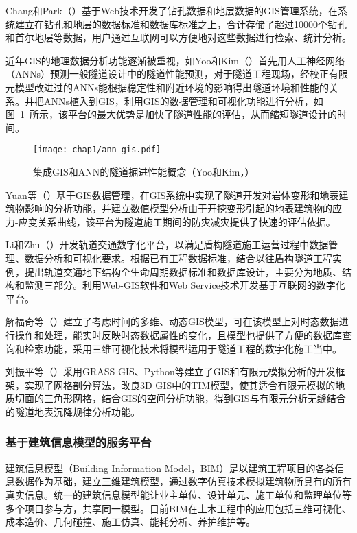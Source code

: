 Chang和Park（\citeyear{chang2004development}）基于Web技术开发了钻孔数据和地层数据的GIS管理系统，在系统建立在钻孔和地层的数据标准和数据库标准之上，合计存储了超过10000个钻孔和首尔地层等数据，用户通过互联网可以方便地对这些数据进行检索、统计分析。

近年GIS的地理数据分析功能逐渐被重视，如Yoo和Kim（\citeyear{yoo2007tunneling}）首先用人工神经网络（ANNs）预测一般隧道设计中的隧道性能预测，对于隧道工程现场，经校正有限元模型改进过的ANNs能根据稳定性和附近环境的影响得出隧道环境和性能的关系。并把ANNs植入到GIS，利用GIS的数据管理和可视化功能进行分析，如图~\ref{fig:集成GIS和ANN的隧道掘进性能概念}~所示，该平台的最大优势是加快了隧道性能的评估，从而缩短隧道设计的时间。

\begin{figure}[!h]
	\centering
	\texttt{[image: chap1/ann-gis.pdf]}
	\caption{集成GIS和ANN的隧道掘进性能概念（Yoo和Kim，\citeyear{yoo2007tunneling}）}
	\label{fig:集成GIS和ANN的隧道掘进性能概念}
\end{figure}

Yuan等（\citeyear{yuan2012study}）基于GIS数据管理，在GIS系统中实现了隧道开发对岩体变形和地表建筑物影响的分析功能，并建立数值模型分析由于开挖变形引起的地表建筑物的应力-应变关系曲线，该平台为隧道施工期间的防灾减灾提供了快速的评估依据。

Li和Zhu（\citeyear{li2013development}）开发轨道交通数字化平台，以满足盾构隧道施工运营过程中数据管理、数据分析和可视化要求。根据已有工程数据标准，结合以往盾构隧道工程实例，提出轨道交通地下结构全生命周期数据标准和数据库设计，主要分为地质、结构和监测三部分。利用Web-GIS软件和Web Service技术开发基于互联网的数字化平台。

解福奇等（\citeyear{解福奇2009时态}）建立了考虑时间的多维、动态GIS模型，可在该模型上对时态数据进行操作和处理，能实时反映时态数据属性的变化，且模型也提供了方便的数据库查询和检索功能，采用三维可视化技术将模型运用于隧道工程的数字化施工当中。

刘振平等（\citeyear{刘振平20173d}）采用GRASS GIS、Python等建立了GIS和有限元模拟分析的开发框架，实现了网格剖分算法，改良3D GIS中的TIM模型，使其适合有限元模拟的地质切面的三角形网格，结合GIS的空间分析功能，得到GIS与有限元分析无缝结合的隧道地表沉降规律分析功能。

\subsubsection{基于建筑信息模型的服务平台}

建筑信息模型（Building Information Model，BIM）是以建筑工程项目的各类信息数据作为基础，建立三维建筑模型，通过数字仿真技术模拟建筑物所具有的所有真实信息。统一的建筑信息模型能让业主单位、设计单元、施工单位和监理单位等多个项目参与方，共享同一模型。目前BIM在土木工程中的应用包括三维可视化、成本造价、几何碰撞、施工仿真、能耗分析、养护维护等。

